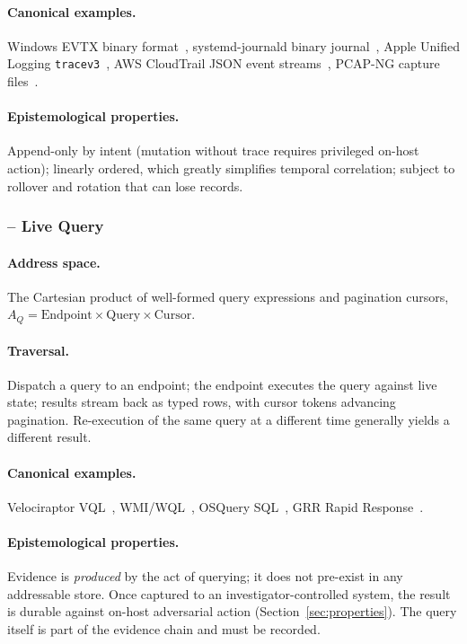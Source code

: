 \paragraph{Canonical examples.} Windows EVTX binary
format~\cite{microsoft2023evtx}, systemd-journald binary
journal~\cite{poettering2012journal}, Apple Unified Logging
\texttt{tracev3}~\cite{apple2016unifiedlogging}, AWS CloudTrail JSON event
streams~\cite{aws2024cloudtrail}, PCAP-NG capture
files~\cite{pcapng2024}.
\paragraph{Epistemological properties.} Append-only by intent (mutation
without trace requires privileged on-host action); linearly ordered, which
greatly simplifies temporal correlation; subject to rollover and rotation
that can lose records.

\subsubsection{ -- Live Query}

\paragraph{Address space.} The Cartesian product of well-formed query
expressions and pagination cursors, $A_{Q} = \mathrm{Endpoint} \times
\mathrm{Query} \times \mathrm{Cursor}$.
\paragraph{Traversal.} Dispatch a query to an endpoint; the endpoint
executes the query against live state; results stream back as typed rows,
with cursor tokens advancing pagination. Re-execution of the same query at a
different time generally yields a different result.
\paragraph{Canonical examples.} Velociraptor VQL~\cite{velociraptor},
WMI/WQL~\cite{microsoft2023wmi}, OSQuery SQL~\cite{osquery}, GRR
Rapid Response~\cite{cohen2011distributed}.
\paragraph{Epistemological properties.} Evidence is \emph{produced} by the
act of querying; it does not pre-exist in any addressable store. Once
captured to an investigator-controlled system, the result is durable against
on-host adversarial action (Section~\ref{sec:properties}). The query itself
is part of the evidence chain and must be recorded.

